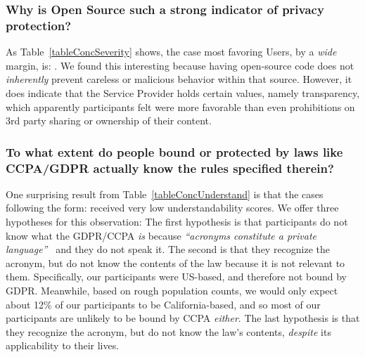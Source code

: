 \subsubsection{Why is Open Source such a strong indicator of privacy protection?}

As Table~\ref{tableConcSeverity} shows, the case most favoring Users, by a \textit{wide} margin, is:
.
We found this interesting because having open-source code does not \textit{inherently} prevent careless or malicious behavior within that source.
However, it does indicate that the Service Provider holds certain values, namely transparency, which apparently participants felt were more favorable than even prohibitions on 3rd party sharing or ownership of their content.

\subsubsection{To what extent do people bound or protected by laws like CCPA/GDPR actually know the rules specified therein?}


One surprising result from Table~\ref{tableConcUnderstand} is that the cases following the form:
received very low understandability scores.
We offer three hypotheses for this observation:
The first hypothesis is that participants do not know what the GDPR/CCPA \textit{is} because \textit{``acronyms constitute a private language''}~\cite{CISEcareer} and they do not speak it.
The second is that they recognize the acronym, but do not know the contents of the law because it is not relevant to them.
Specifically, our participants were US-based, and therefore not bound by GDPR.
Meanwhile, based on rough population counts, we would only expect about 12\% of our participants to be California-based, and so most of our participants are unlikely to be bound by CCPA \textit{either}.
The last hypothesis is that they recognize the acronym, but do not know the law's contents, \textit{despite} its applicability to their lives.